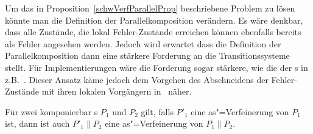 Um das in Proposition~\ref{schwVerfParallelProp} beschriebene Problem zu lösen
könnte man die Definition der Parallelkomposition verändern. Es wäre denkbar,
dass alle Zustände, die lokal Fehler-Zustände erreichen können ebenfalls
bereits als Fehler angesehen werden. Jedoch wird erwartet dass die Definition
der Parallelkomposition dann eine stärkere Forderung an die Transitionssysteme
stellt. Für Implementierungen wäre die Forderung sogar stärkere, wie die der
\EIO{}s in z.B.~\cite{Schinko2016BA}. Dieser Ansatz käme jedoch dem Vorgehen
des Abschneidens der Fehler-Zustände mit ihren lokalen Vorgängern
in~\cite{Vogler2016MIA3} näher.

\begin{Kor}
  \label{verfParallelKor}
  Für zwei komponierbar \MEIO{}s $P_1$ und $P_2$ gilt, falls $P'_1$ eine
  as"=Verfeinerung von $P_1$ ist, dann ist auch $P'_1\|P_2$ eine
  as"=Verfeinerung von $P_1\|P_2$.
\end{Kor}
